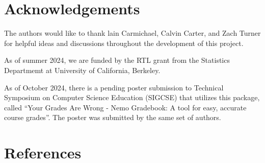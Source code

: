 \documentclass[10pt,a4paper,onecolumn]{article}
\begin{document}
\hypertarget{acknowledgements}{%
\section{Acknowledgements}\label{acknowledgements}}

The authors would like to thank lain Carmichael, Calvin Carter, and Zach
Turner for helpful ideas and discussions throughout the development of
this project.

As of summer 2024, we are funded by the RTL grant from the Statistics
Departmemt at University of California, Berkeley.

As of October 2024, there is a pending poster submission to Technical
Symposium on Computer Science Education (SIGCSE) that utilizes this
package, called ``Your Grades Are Wrong - Nemo Gradebook: A tool for
easy, accurate course grades''. The poster was submitted by the same set
of authors.

\hypertarget{references}{%
\section*{References}\label{references}}
\end{document}
